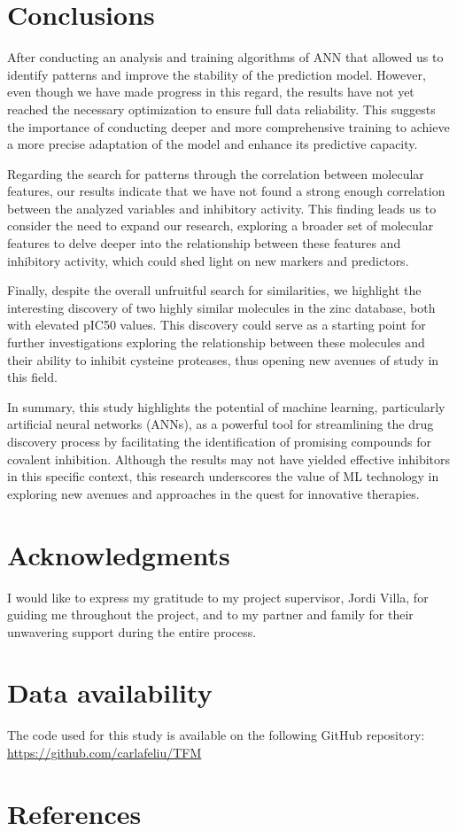 \documentclass[final,times,twocolumn,article]{elsarticle}
\begin{document}
\FloatBarrier
\section{Conclusions}

After conducting an analysis and training algorithms of ANN that allowed us to identify patterns and improve the stability of the prediction model. However, even though we have made progress in this regard, the results have not yet reached the necessary optimization to ensure full data reliability. This suggests the importance of conducting deeper and more comprehensive training to achieve a more precise adaptation of the model and enhance its predictive capacity.

Regarding the search for patterns through the correlation between molecular features, our results indicate that we have not found a strong enough correlation between the analyzed variables and inhibitory activity. This finding leads us to consider the need to expand our research, exploring a broader set of molecular features to delve deeper into the relationship between these features and inhibitory activity, which could shed light on new markers and predictors.

Finally, despite the overall unfruitful search for similarities, we highlight the interesting discovery of two highly similar molecules in the zinc database, both with elevated pIC50 values. This discovery could serve as a starting point for further investigations exploring the relationship between these molecules and their ability to inhibit cysteine proteases, thus opening new avenues of study in this field.

In summary, this study highlights the potential of machine learning, particularly artificial neural networks (ANNs), as a powerful tool for streamlining the drug discovery process by facilitating the identification of promising compounds for covalent inhibition. Although the results may not have yielded effective inhibitors in this specific context, this research underscores the value of ML technology in exploring new avenues and approaches in the quest for innovative therapies.

\section{Acknowledgments}

I would like to express my gratitude to my project supervisor, Jordi Villa, for guiding me throughout the project, and to my partner and family for their unwavering support during the entire process.


\appendix

\section{Data availability}

The code used for this study is available on the following GitHub repository: \href{https://github.com/carlafeliu/TFM}{https://github.com/carlafeliu/TFM}


\section{References}
 

\end{document}
